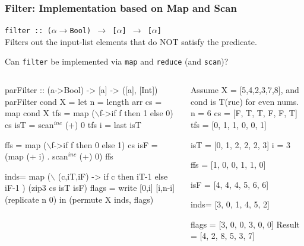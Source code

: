 \documentclass{beamer}
\renewcommand{\emph}[1]{\textcolor{structure}{#1}}
\newcommand{\emp}[1]{\textcolor{DikuRed}{ #1}}
\newcommand{\mymath}[1]{$ #1 $}
\newcommand{\myindu}[1]{^{#1}}
\begin{document}
\begin{frame}[fragile,t]
  \frametitle{Filter: Implementation based on Map and Scan}


\emph{\tt filter :: ($\alpha\rightarrow$Bool) $\rightarrow$ [$\alpha$] $\rightarrow$ [$\alpha$]}\\
Filters out the input-list elements that do NOT satisfy the predicate.

\alert{Can {\tt filter} be implemented via {\tt map} and {\tt reduce} (and {\tt scan})?}\pause


\begin{columns}
\begin{colorcode}[fontsize=\scriptsize]
parFilter :: (a->Bool) -> [a] -> ([a], [Int])
parFilter cond X = 
let n   = length arr
    cs  = map cond X
    tfs = map (\mymath{\backslash}f->if f then 1 
                        else 0) cs
    isT = scan\mymath{\myindu{inc}} (+) 0 tfs
    i   = last isT

    ffs = map (\mymath{\backslash}f->if f then 0 
                        else 1) cs
    isF = (map (+ i) . scan\mymath{\myindu{inc}} (+) 0) ffs

    inds= map (\mymath{\backslash} (c,iT,iF) -> 
                  if c then iT-1 else iF-1 ) 
              (zip3 cs isT isF)
    flags = write [0,i] [i,n-i] (replicate n 0)
in  (permute X inds, flags)
\end{colorcode}
\begin{colorcode}[fontsize=\scriptsize]
Assume X = [5,4,2,3,7,8], and 
cond is T(rue) for even nums.
n   = 6
cs  = [F, T, T, F, F, T]
tfs = [0, 1, 1, 0, 0, 1]

isT = [0, 1, 2, 2, 2, 3]
i   = 3

ffs = [1, 0, 0, 1, 1, 0]

isF = [4, 4, 4, 5, 6, 6]

inds= [3, 0, 1, 4, 5, 2]


flags  = [3, 0, 0, 3, 0, 0]
Result = [4, 2, 8, 5, 3, 7] 
\end{colorcode}
\end{columns}

\end{frame}
\end{document}
